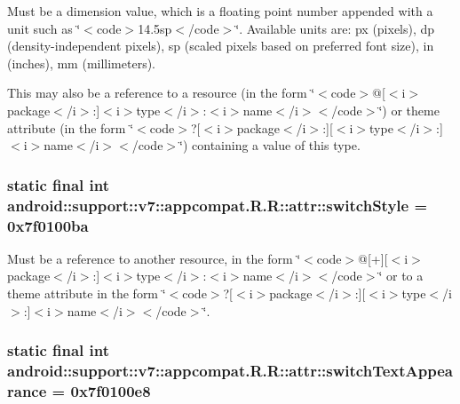 Must be a dimension value, which is a floating point number appended with a unit such as \char`\"{}$<$code$>$14.5sp$<$/code$>$\char`\"{}. Available units are: px (pixels), dp (density-independent pixels), sp (scaled pixels based on preferred font size), in (inches), mm (millimeters). 

This may also be a reference to a resource (in the form \char`\"{}$<$code$>$@\mbox{[}$<$i$>$package$<$/i$>$:\mbox{]}$<$i$>$type$<$/i$>$:$<$i$>$name$<$/i$>$$<$/code$>$\char`\"{}) or theme attribute (in the form \char`\"{}$<$code$>$?\mbox{[}$<$i$>$package$<$/i$>$:\mbox{]}\mbox{[}$<$i$>$type$<$/i$>$:\mbox{]}$<$i$>$name$<$/i$>$$<$/code$>$\char`\"{}) containing a value of this type. \hypertarget{classandroid_1_1support_1_1v7_1_1appcompat_1_1_r_1_1attr_5544332f304b9b252067b01c02c87558}{
\subsubsection[{switchStyle}]{\setlength{\rightskip}{0pt plus 5cm}static final int android::support::v7::appcompat.R.R::attr::switchStyle = 0x7f0100ba}}
\label{classandroid_1_1support_1_1v7_1_1appcompat_1_1_r_1_1attr_5544332f304b9b252067b01c02c87558}


Must be a reference to another resource, in the form \char`\"{}$<$code$>$@\mbox{[}+\mbox{]}\mbox{[}$<$i$>$package$<$/i$>$:\mbox{]}$<$i$>$type$<$/i$>$:$<$i$>$name$<$/i$>$$<$/code$>$\char`\"{} or to a theme attribute in the form \char`\"{}$<$code$>$?\mbox{[}$<$i$>$package$<$/i$>$:\mbox{]}\mbox{[}$<$i$>$type$<$/i$>$:\mbox{]}$<$i$>$name$<$/i$>$$<$/code$>$\char`\"{}. \hypertarget{classandroid_1_1support_1_1v7_1_1appcompat_1_1_r_1_1attr_13517aa6c71334e82faefaffd63b21d7}{
\subsubsection[{switchTextAppearance}]{\setlength{\rightskip}{0pt plus 5cm}static final int android::support::v7::appcompat.R.R::attr::switchTextAppearance = 0x7f0100e8}}
\label{classandroid_1_1support_1_1v7_1_1appcompat_1_1_r_1_1attr_13517aa6c71334e82faefaffd63b21d7}


